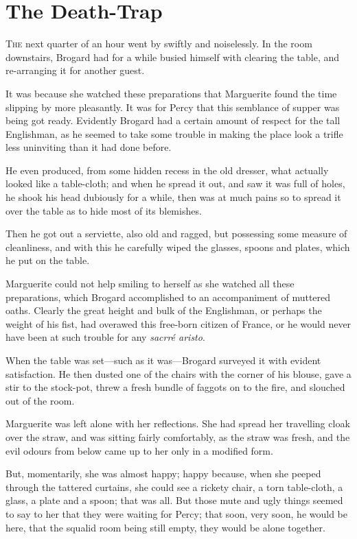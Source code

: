 
\chapter{The Death-Trap}
\lettrine[lines=4]{T}{he} next quarter of an hour went by swiftly and noiselessly. In the room downstairs, Brogard had for a while busied himself with clearing the table, and re-arranging it for another guest.

It was because she watched these preparations that Marguerite found the time slipping by more pleasantly. It was for Percy that this semblance of supper was being got ready. Evidently Brogard had a certain amount of respect for the tall Englishman, as he seemed to take some trouble in making the place look a trifle less uninviting than it had done before.

He even produced, from some hidden recess in the old dresser, what actually looked like a table-cloth; and when he spread it out, and saw it was full of holes, he shook his head dubiously for a while, then was at much pains so to spread it over the table as to hide most of its blemishes.

Then he got out a serviette, also old and ragged, but possessing some measure of cleanliness, and with this he carefully wiped the glasses, spoons and plates, which he put on the table.

Marguerite could not help smiling to herself as she watched all these preparations, which Brogard accomplished to an accompaniment of muttered oaths. Clearly the great height and bulk of the Englishman, or perhaps the weight of his fist, had overawed this free-born citizen of France, or he would never have been at such trouble for any \textit{sacrré aristo}.

When the table was set---such as it was---Brogard surveyed it with evident satisfaction. He then dusted one of the chairs with the corner of his blouse, gave a stir to the stock-pot, threw a fresh bundle of faggots on to the fire, and slouched out of the room.

Marguerite was left alone with her reflections. She had spread her travelling cloak over the straw, and was sitting fairly comfortably, as the straw was fresh, and the evil odours from below came up to her only in a modified form.

But, momentarily, she was almost happy; happy because, when she peeped through the tattered curtains, she could see a rickety chair, a torn table-cloth, a glass, a plate and a spoon; that was all. But those mute and ugly things seemed to say to her that they were waiting for Percy; that soon, very soon, he would be here, that the squalid room being still empty, they would be alone together.

